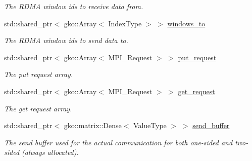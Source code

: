 \begin{DoxyCompactItemize}
\begin{DoxyCompactList}\small\item\em The R\+D\+MA window ids to receive data from. \end{DoxyCompactList}\item 
\mbox{\label{structschwz_1_1Communicate_1_1comm__struct_aef866f16ced557ba1496cffaf7c2473e}} 
std\+::shared\+\_\+ptr$<$ gko\+::\+Array$<$ Index\+Type $>$ $>$ \hyperlink{structschwz_1_1Communicate_1_1comm__struct_aef866f16ced557ba1496cffaf7c2473e}{windows\+\_\+to}
\begin{DoxyCompactList}\small\item\em The R\+D\+MA window ids to send data to. \end{DoxyCompactList}\item 
\mbox{\label{structschwz_1_1Communicate_1_1comm__struct_a9f135d4c33838027f8ed64a3ee18d42f}} 
std\+::shared\+\_\+ptr$<$ gko\+::\+Array$<$ M\+P\+I\+\_\+\+Request $>$ $>$ \hyperlink{structschwz_1_1Communicate_1_1comm__struct_a9f135d4c33838027f8ed64a3ee18d42f}{put\+\_\+request}
\begin{DoxyCompactList}\small\item\em The put request array. \end{DoxyCompactList}\item 
\mbox{\label{structschwz_1_1Communicate_1_1comm__struct_a91cc6e7d906fbb693e4dff2dee609c94}} 
std\+::shared\+\_\+ptr$<$ gko\+::\+Array$<$ M\+P\+I\+\_\+\+Request $>$ $>$ \hyperlink{structschwz_1_1Communicate_1_1comm__struct_a91cc6e7d906fbb693e4dff2dee609c94}{get\+\_\+request}
\begin{DoxyCompactList}\small\item\em The get request array. \end{DoxyCompactList}\item 
\mbox{\label{structschwz_1_1Communicate_1_1comm__struct_afc441e718856c45bd3cc462780886ca8}} 
std\+::shared\+\_\+ptr$<$ gko\+::matrix\+::\+Dense$<$ Value\+Type $>$ $>$ \hyperlink{structschwz_1_1Communicate_1_1comm__struct_afc441e718856c45bd3cc462780886ca8}{send\+\_\+buffer}
\begin{DoxyCompactList}\small\item\em The send buffer used for the actual communication for both one-\/sided and two-\/sided (always allocated). \end{DoxyCompactList}\item 

\end{DoxyCompactItemize}
